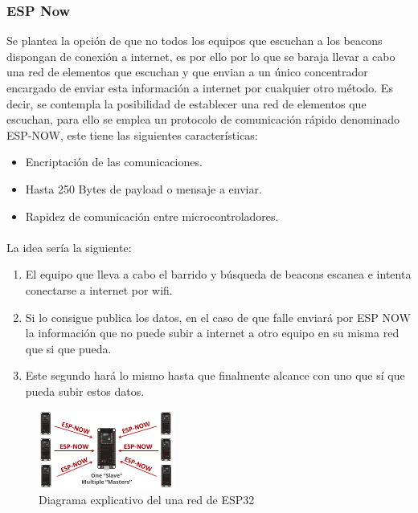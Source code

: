 \documentclass[paper=a4, fontsize=11pt,twoside]{scrartcl}	%
\begin{document}
\begin{enumerate}
        \subsubsection {ESP Now}
            Se plantea la opción de que no todos los equipos que escuchan a los beacons dispongan de conexión a internet, es por ello
            por lo que se baraja llevar a cabo una red de elementos que escuchan y que envian a un único concentrador encargado de enviar
            esta información a internet por cualquier otro método.
            Es decir, se contempla la posibilidad de establecer una red de elementos que escuchan, para ello se emplea 
            un protocolo de comunicación rápido denominado ESP-NOW, este tiene las siguientes características:
            \begin{itemize}
                \item Encriptación de las comunicaciones.
                \item Hasta 250 Bytes de payload o mensaje a enviar.
                \item Rapidez de comunicación entre microcontroladores.
            \end{itemize}
            \paragraph{}
            La idea sería la siguiente:
            \begin{enumerate}
                \item El equipo que lleva a cabo el barrido y búsqueda de beacons escanea e intenta conectarse a 
                internet por wifi.
                \item Si lo consigue publica los datos, en el caso de que falle enviará por ESP NOW la información
                que no puede subir a internet a otro equipo en su misma red que si que pueda.
                \item Este segundo hará lo mismo hasta que finalmente alcance con uno que sí que pueda subir estos datos.
            \end{enumerate}
            \begin{center}
                \begin{figure}[ht]
                    \centering
                    \includegraphics[width=0.4\textwidth]{espnow.PNG}
                    \caption{Diagrama explicativo del una red de ESP32}
                    \label{fig:mesh4}
                \end{figure}
            \end{center}
        \end{enumerate}
\end{document}
